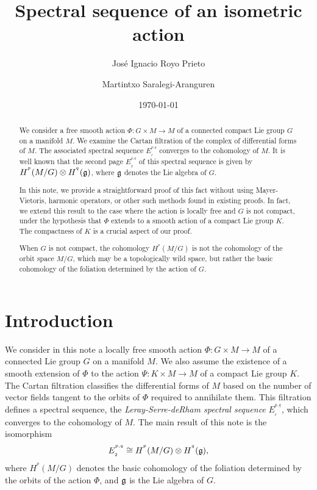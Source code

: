 \documentclass[a4paper,oneside,10pt,reqno]{amsart}
\title
{Spectral sequence of an isometric action}
\date{\today}
\author[J.I.~Royo Prieto]{Jos\'{e} Ignacio Royo Prieto}
\author{Martintxo Saralegi-Aranguren}
\theoremstyle{definition}
\newcommand{\g}{\noindent {\mathfrak{g}}}
\newcommand{\hiru}[3]{{#1}^{^{#2}}_{_{#3}}}
\newcommand{\coho}[3]{{#1}^{^{#2}}{\left( #3 \right)}}
\begin{document}
  





\thispagestyle{empty}

\begin{abstract}
We consider a free smooth action $\Phi \colon G \times M \to M$ of a connected compact Lie group $G$ on a manifold $M$.
We examine the Cartan filtration of the complex of differential forms of $M$. The associated spectral sequence $\hiru{E}{p,q}{r}$ converges to the cohomology of $M$. It is well known that the second page $\hiru{E}{p,q}{2}$  of this spectral sequence is given by $\coho H p {M/G} \otimes \coho H q \g$, where $\g$ denotes the Lie algebra of $G$.


In this note, we provide a straightforward proof of this fact without using Mayer-Vietoris, harmonic operators, or other such methods found in existing proofs. In fact, we extend this result to the case where the action is locally free and  $G$ is not compact, under the hypothesis that $\Phi$ extends to a smooth action of a compact Lie group $K$. The compactness of $K$ is a crucial aspect of our proof.

When $G$ is not compact, the cohomology $\coho H p {M/G} $ is not the cohomology of the orbit space $M/G$, which may be a topologically wild space, but rather the basic cohomology of the foliation determined by the action of $G$.
\end{abstract}


\maketitle



\section{Introduction}\label{sec1}







We consider in this note a locally free smooth action $\Phi \colon G \times M \to M$ of a  connected Lie group $G$ on a manifold $M$. 
We also assume the existence of a smooth  extension of $\Phi$ to the action
$\Psi \colon K \times M \to M$ of a compact Lie group $K$.
The Cartan filtration classifies the differential forms of $M$ based on the number of vector fields tangent to the orbits of $\Phi$ required to annihilate them. This filtration defines a spectral sequence, the \emph{Leray-Serre-deRham spectral sequence}  $\hiru{E}{p,q}{r}$, which converges to the cohomology of $M$. The main result of this note is the isomorphism
\begin{equation}\label{ee}
\hiru{E}{p,q}{2} \cong \coho Hp{M/G} \otimes \coho H q \g,
\end{equation}
where $ \coho Hp{M/G} $ denotes the basic cohomology of the foliation determined by the orbits of the action $\Phi$, and $\g$ is the Lie algebra of $G$.
\end{document}
